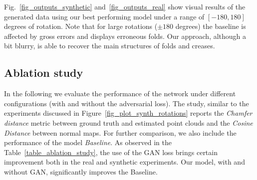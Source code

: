 Fig.~\ref{fig_outputs_synthetic} and~\ref{fig_outputs_real} show visual results of the generated data using our best performing model under a range  of $[-180,180]$ degrees of rotation. Note that for large rotations ($\pm 180$ degrees) the baseline is affected by gross errors and displays erroneous folds. Our approach, although a bit blurry, is able to recover the main structures of folds and creases. 

\subsection{Ablation study}

In the following we    evaluate  the performance of the network under different configurations (with and without the adversarial loss). The study, similar to the experiments discussed in Figure~\ref{fig_plot_synth_rotations} reports the \textit{Chamfer distance} metric  between ground truth and estimated point clouds  and the \textit{Cosine Distance} between normal maps.  For further comparison, we also include the performance of the model {\em Baseline}. As observed in the Table~\ref{table_ablation_study}, the use of the GAN loss brings certain improvement both in the real and synthetic experiments. Our model, with and without GAN, significantly improves the Baseline.

\begin{table}[t!]
\begin{center}
\caption{\small{{\bf Quantitative results under different network configurations.} The table shows the results in terms of \textit{Chamfer distance}   mean and standard deviation and the \textit{Cosine Distance}  between the normals maps for the Baseline and the model trained with and without the Adversarial loss. The evaluation has been done from -180 to 180 degrees of rotation.}}
\label{table_ablation_study}
\end{center}
\end{table}

